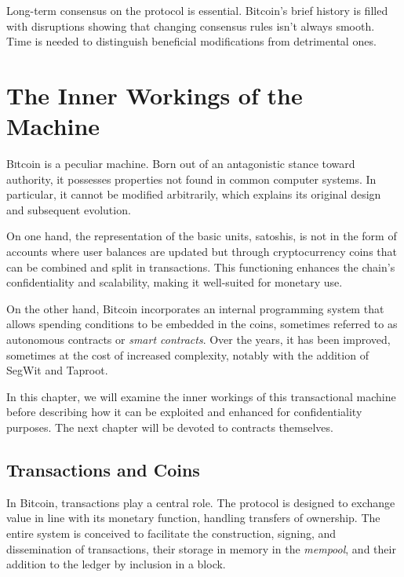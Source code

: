 \documentclass[
  a5paper,
  smalldemyvopaper,10pt,twoside,onecolumn,openright,extrafontsizes,hidelinks]{memoir}
\begin{document}
Long-term consensus on the protocol is essential. Bitcoin's brief
history is filled with disruptions showing that changing consensus rules
isn't always smooth. Time is needed to distinguish beneficial
modifications from detrimental ones.


\chapter{The Inner Workings of the Machine}\label{ch:inner-workings}

\label{enotezch:12}{}

{B}\textsc{i}tcoin is a peculiar machine. Born out of an antagonistic
stance toward authority, it possesses properties not found in common
computer systems. In particular, it cannot be modified arbitrarily,
which explains its original design and subsequent evolution.

On one hand, the representation of the basic units, satoshis, is not in
the form of accounts where user balances are updated but through
cryptocurrency coins that can be combined and split in transactions.
This functioning enhances the chain's confidentiality and scalability,
making it well-suited for monetary use.

On the other hand, Bitcoin incorporates an internal programming system
that allows spending conditions to be embedded in the coins, sometimes
referred to as autonomous contracts or \emph{smart contracts}. Over the
years, it has been improved, sometimes at the cost of increased
complexity, notably with the addition of SegWit and Taproot.

In this chapter, we will examine the inner workings of this
transactional machine before describing how it can be exploited and
enhanced for confidentiality purposes. The next chapter will be devoted
to contracts themselves.

\section*{Transactions and Coins}\label{transactions-and-coins}


In Bitcoin, transactions play a central role. The protocol is designed
to exchange value in line with its monetary function, handling transfers
of ownership. The entire system is conceived to facilitate the
construction, signing, and dissemination of transactions, their storage
in memory in the \emph{mempool}, and their addition to the ledger by
inclusion in a block.
\end{document}
